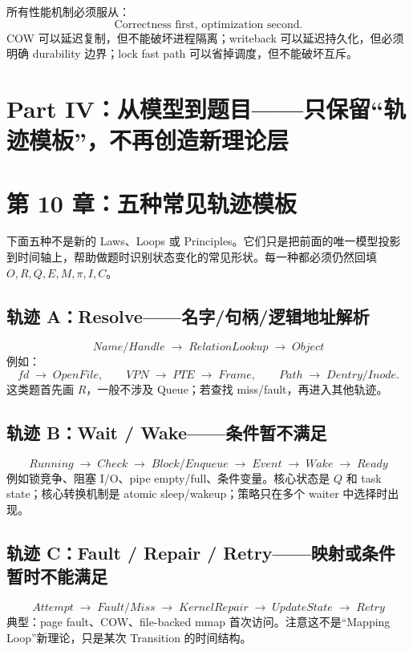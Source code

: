 \documentclass[11pt,a4paper]{ctexart}
\newcommand{\arr}{\;\longrightarrow\;}
\begin{document}
\begin{warn}[优化不能破坏不变量]
所有性能机制必须服从：
\[
\boxed{\text{Correctness first, optimization second}.}
\]
COW 可以延迟复制，但不能破坏进程隔离；writeback 可以延迟持久化，但必须明确 durability 边界；lock fast path 可以省掉调度，但不能破坏互斥。
\end{warn}

\newpage
\section{Part IV：从模型到题目——只保留“轨迹模板”，不再创造新理论层}

\section{第 10 章：五种常见轨迹模板}

\begin{corebox}[定位说明]
下面五种不是新的 Laws、Loops 或 Principles。它们只是把前面的唯一模型投影到时间轴上，帮助做题时识别状态变化的常见形状。每一种都必须仍然回填 $O,R,Q,E,M,\pi,I,C$。
\end{corebox}

\subsection{轨迹 A：Resolve——名字/句柄/逻辑地址解析}
\[
\boxed{Name/Handle\arr RelationLookup\arr Object}
\]
例如：
\[
fd\arr OpenFile,
\qquad
VPN\arr PTE\arr Frame,
\qquad
Path\arr Dentry/Inode.
\]
这类题首先画 $R$，一般不涉及 Queue；若查找 miss/fault，再进入其他轨迹。

\subsection{轨迹 B：Wait / Wake——条件暂不满足}
\[
\boxed{Running\arr Check\arr Block/Enqueue\arr Event\arr Wake\arr Ready}
\]
例如锁竞争、阻塞 I/O、pipe empty/full、条件变量。核心状态是 $Q$ 和 task state；核心转换机制是 atomic sleep/wakeup；策略只在多个 waiter 中选择时出现。

\subsection{轨迹 C：Fault / Repair / Retry——映射或条件暂时不能满足}
\[
\boxed{Attempt\arr Fault/Miss\arr KernelRepair\arr UpdateState\arr Retry}
\]
典型：page fault、COW、file-backed mmap 首次访问。注意这不是“Mapping Loop”新理论，只是某次 Transition 的时间结构。
\end{document}
